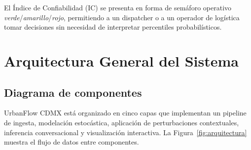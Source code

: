 \documentclass[11pt,a4paper]{article}
\begin{document}
El Índice de Confiabilidad (IC) se presenta en forma de semáforo operativo \textit{verde}/\textit{amarillo}/\textit{rojo}, permitiendo a un dispatcher o a un operador de logística tomar decisiones sin necesidad de interpretar percentiles probabilísticos.

\section{Arquitectura General del Sistema}

\subsection{Diagrama de componentes}

UrbanFlow CDMX está organizado en cinco capas que implementan un pipeline de ingesta, modelación estocástica, aplicación de perturbaciones contextuales, inferencia conversacional y visualización interactiva. La Figura~\ref{fig:arquitectura} muestra el flujo de datos entre componentes.
\end{document}
